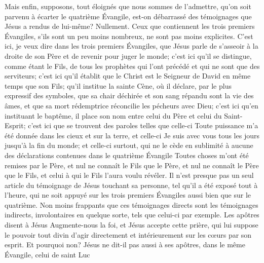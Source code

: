 Mais enfin, supposons, tout éloignés que nous sommes de l’admettre,
qu’on soit parvenu à écarter le quatrième Évangile, est-on débarrassé des témoignages que Jésus a rendus de lui-même?
Nullement. Ceux que contiennent les trois premiers Évangiles, s’ils sont un peu moins nombreux, ne sont pas moins explicites.
C’est ici, je veux dire dans les trois premiers Évangiles, que Jésus parle de s’asseoir à la droite de son Père et de revenir pour juger le monde;
c’est ici qu’il se distingue, comme étant le Fils, de tous les prophètes qui l’ont précédé et qui ne sont que des serviteurs;
c’est ici qu’il établit que le Christ est le Seigneur de David en même temps que son Fils;
qu’il institue la sainte Cène, où il déclare, par le plus expressif des symboles, que sa chair déchirée et son sang répandu sont la vie des âmes, et que sa mort rédemptrice réconcilie les pécheurs avec Dieu;
c’est ici qu’en instituant le baptême, il place son nom entre celui du Père et celui du Saint-Esprit;
c’est ici que se trouvent des paroles telles que celle-ci\frcolon{}
\Og{} Toute puissance m’a été donnée dans les cieux et sur la terre\Fg{},
et celle-ci\frcolon{} \Og{} Je suis avec vous tous les jours jusqu’à la fin du monde\Fg{};
et celle-ci surtout, qui ne le cède en sublimité à aucune des déclarations contenues dans le quatrième Évangile\frcolon{}
\Og{} Toutes choses m’ont été remises par le Père, et nul ne connaît le Fils que le Père,
et nul ne connaît le Père que le Fils, et celui à qui le Fils l’aura voulu révéler.\Fg{}
Il n’est presque pas un seul article du témoignage de Jésus touchant sa personne,
tel qu’il a été exposé tout à l’heure, qui ne soit appuyé sur les trois premiers Évangiles
aussi bien que sur le quatrième.
Non moins frappants que ces témoignages directs sont les témoignages indirects,
involontaires en quelque sorte, tels que celui-ci par exemple.
Les apôtres disent à Jésus\frcolon{}
\Og{} Augmente-nous la foi\Fg{},
et Jésus accepte cette prière, qui lui suppose le pouvoir
tout divin d’agir directement et intérieurement sur les cœurs par son esprit.
Et pourquoi non? Jésus ne dit-il pas aussi à ses apôtres, dans le même Évangile, celui de saint Luc\frcolon{}
